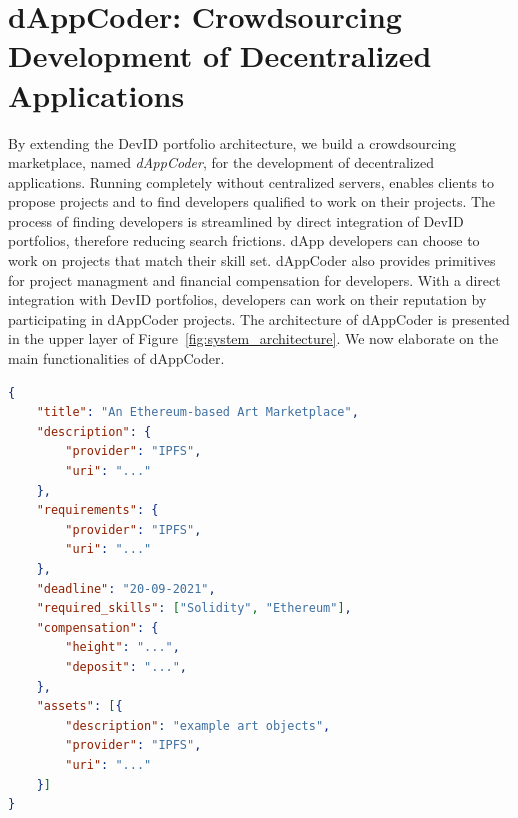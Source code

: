 \section{dAppCoder: Crowdsourcing Development of Decentralized Applications}
\label{sec:dappcoder}
By extending the DevID portfolio architecture, we build a crowdsourcing marketplace, named \emph{dAppCoder}, for the development of decentralized applications.
Running completely without centralized servers, \Dappcoder{} enables clients to propose projects and to find developers qualified to work on their projects.
The process of finding developers is streamlined by direct integration of DevID portfolios, therefore reducing search frictions.
dApp developers can choose to work on projects that match their skill set.
dAppCoder also provides primitives for project managment and financial compensation for developers.
With a direct integration with DevID portfolios, developers can work on their reputation by participating in dAppCoder projects.
The architecture of dAppCoder is presented in the upper layer of Figure~\ref{fig:system_architecture}.
We now elaborate on the main functionalities of dAppCoder.

\begin{lstlisting}[language=json,firstnumber=1,float=t,caption=A project offered in DAppCoder (in JSON format).,label=lst:devid_project]
{
	"title": "An Ethereum-based Art Marketplace",
	"description": {
		"provider": "IPFS",
		"uri": "..."
	},
	"requirements": {
		"provider": "IPFS",
		"uri": "..."
	},
	"deadline": "20-09-2021",
	"required_skills": ["Solidity", "Ethereum"],
	"compensation": {
		"height": "...",
		"deposit": "...",
	},
	"assets": [{
		"description": "example art objects",
		"provider": "IPFS",
		"uri": "..."
	}]
}
\end{lstlisting}

